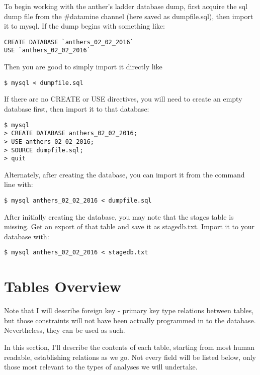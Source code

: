 \documentclass[12pt]{article}
\begin{document}
To begin working with the anther's ladder database dump, first acquire the sql dump file from the \#datamine channel (here saved as dumpfile.sql), then import it to mysql.
If the dump begins with something like:

\begin{verbatim}
CREATE DATABASE `anthers_02_02_2016`
USE `anthers_02_02_2016`
\end{verbatim}

Then you are good to simply import it directly like 

\begin{verbatim}$ mysql < dumpfile.sql \end{verbatim}

If there are no CREATE or USE directives, you will need to create an empty database first, then import it to that database:

\begin{verbatim}
$ mysql
> CREATE DATABASE anthers_02_02_2016;
> USE anthers_02_02_2016;
> SOURCE dumpfile.sql;
> quit
\end{verbatim}

Alternately, after creating the database, you can import it from the command line with:

\begin{verbatim}
$ mysql anthers_02_02_2016 < dumpfile.sql
\end{verbatim}

After initially creating the database, you may note that the stages table is missing. Get an export of that table and save it as stagedb.txt. Import it to your database with:

\begin{verbatim}
$ mysql anthers_02_02_2016 < stagedb.txt
\end{verbatim}

\section{Tables Overview} %
\label{sec:tables_overview}

Note that I will describe foreign key - primary key type relations between tables, but those constraints will not have been actually programmed in to the database. Nevertheless, they can be used as such.

In this section, I'll describe the contents of each table, starting from most human readable, establishing relations as we go.
Not every field will be listed below, only those most relevant to the types of analyses we will undertake.
\end{document}
